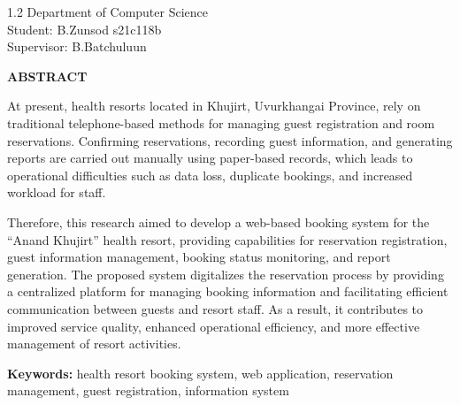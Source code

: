 \vspace{0.5cm}

\begin{flushright}
    \begin{spacing}{1.2}
        {\normalsize Department of Computer Science}\\
        {\normalsize Student: B.Zunsod s21c118b}\\
        {\normalsize Supervisor: B.Batchuluun}
    \end{spacing}
\end{flushright}

\vspace{0.5cm}

\begin{center}
    \textbf{\MakeUppercase{Abstract}}
\end{center}

\vspace{0.3cm}

At present, health resorts located in Khujirt, Uvurkhangai Province, rely on traditional telephone-based methods for managing guest registration and room reservations.
Confirming reservations, recording guest information, and generating reports are carried out manually using paper-based records, which leads to operational difficulties such as data loss, duplicate bookings, and increased workload for staff.

Therefore, this research aimed to develop a web-based booking system for the ``Anand Khujirt'' health resort, providing capabilities for reservation registration, guest information management, booking status monitoring, and report generation. The proposed system digitalizes the reservation process by providing a centralized platform for managing booking information and facilitating efficient communication between guests and resort staff. As a result, it contributes to improved service quality, enhanced operational efficiency, and more effective management of resort activities.
\vspace{1cm}

\noindent \textbf{Keywords:} health resort booking system, web application, reservation management, guest registration, information system
